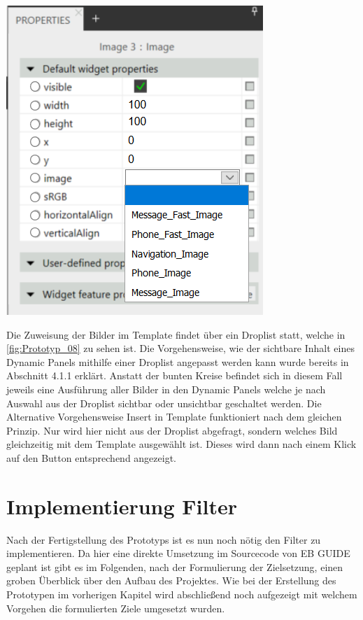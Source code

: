 \begin{center}
  \includegraphics[scale=0.6]{figures/Prototyp_08.PNG}
  \label{fig:Prototyp_08}
\end{center}

Die Zuweisung der Bilder im Template findet über ein Droplist statt, welche in \cref{fig:Prototyp_08} zu sehen ist.
Die Vorgehensweise, wie der sichtbare Inhalt eines Dynamic Panels mithilfe einer Droplist angepasst werden kann wurde bereits in Abschnitt 4.1.1 erklärt.
Anstatt der bunten Kreise befindet sich in diesem Fall jeweils eine Ausführung aller Bilder in den Dynamic Panels welche je nach Auswahl aus der Droplist sichtbar oder unsichtbar geschaltet werden.
Die Alternative Vorgehensweise \glqq Insert in Template\grqq{} funktioniert nach dem gleichen Prinzip.
Nur wird hier nicht aus der Droplist abgefragt, sondern welches Bild gleichzeitig mit dem Template ausgewählt ist.
Dieses wird dann nach einem Klick auf den Button entsprechend angezeigt.


\section {Implementierung Filter}
Nach der Fertigstellung des Prototyps ist es nun noch nötig den Filter zu implementieren.
Da hier eine direkte Umsetzung im Sourcecode von EB GUIDE geplant ist gibt es im Folgenden, nach der Formulierung der Zielsetzung,  einen groben Überblick über den Aufbau des Projektes.
Wie bei der Erstellung des Prototypen im vorherigen Kapitel wird abschließend noch aufgezeigt mit welchem Vorgehen die formulierten Ziele umgesetzt wurden.

